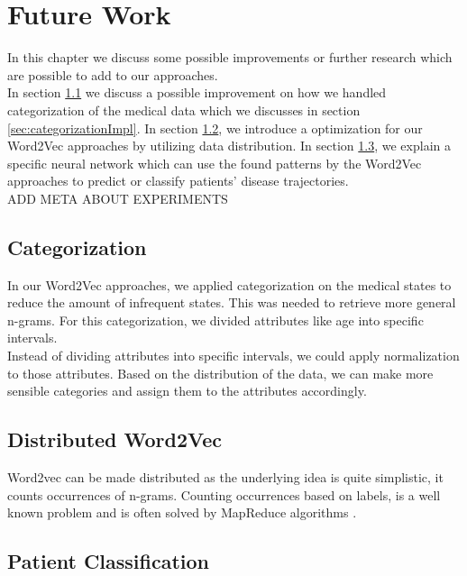 \graphicspath{ {FutureWork/Images/} }


\chapter{Future Work}
\label{cha:futureWork}

In this chapter we discuss some possible improvements or further research which are possible to add to our approaches. \\
In section \ref{sec:categorization} we discuss a possible improvement on how we handled categorization of the medical data which we discusses in section \ref{sec:categorizationImpl}. In section \ref{sec:distributed}, we introduce a optimization for our Word2Vec approaches by utilizing data distribution. In section \ref{sec:PatientClassification}, we explain a specific neural network which can use the found patterns by the Word2Vec approaches to predict or classify patients' disease trajectories. \\


ADD META ABOUT EXPERIMENTS


\section{Categorization}
\label{sec:categorization}

In our Word2Vec approaches, we applied categorization on the medical states to reduce the amount of infrequent states. This was needed to retrieve more general n-grams. For this categorization, we divided attributes like age into specific intervals. \\

Instead of dividing attributes into specific intervals, we could apply normalization to those attributes. Based on the distribution of the data, we can make more sensible categories and assign them to the attributes accordingly.


\section{Distributed Word2Vec}
\label{sec:distributed}

Word2vec can be made distributed as the underlying idea is quite simplistic, it counts occurrences of n-grams. Counting occurrences based on labels, is a well known problem and is often solved by MapReduce algorithms \cite{mapreduce:article}. 


\section{Patient Classification}
\label{sec:PatientClassification}

